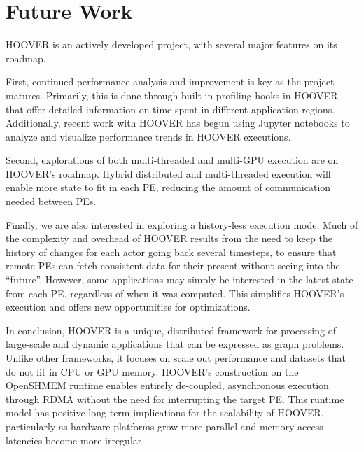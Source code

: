 \section{Future Work}

HOOVER is an actively developed project, with several major features on its
roadmap.

First, continued performance analysis and improvement is key as the project
matures. Primarily, this is done through built-in profiling hooks in HOOVER
that offer detailed information on time spent in different application regions.
Additionally, recent work with HOOVER has begun using Jupyter notebooks to
analyze and visualize performance trends in HOOVER executions.

Second, explorations of both multi-threaded and multi-GPU execution are on
HOOVER's roadmap. Hybrid distributed and multi-threaded execution will enable
more state to fit in each PE, reducing the amount of communication needed
between PEs.

Finally, we are also interested in exploring a history-less execution mode.
Much of the complexity and overhead of HOOVER results from the need to keep
the history of changes for each actor going back several timesteps, to ensure
that remote PEs can fetch consistent data for their present without seeing into
the ``future''. However, some applications may simply be interested in the
latest state from each PE, regardless of when it was computed. This
simplifies HOOVER's execution and offers new opportunities for optimizations.

In conclusion, HOOVER is a unique, distributed framework for processing of
large-scale and dynamic applications that can be expressed as graph
problems. Unlike other frameworks, it focuses on scale out performance and
datasets that do not fit in CPU or GPU memory. HOOVER's construction on the
OpenSHMEM runtime enables entirely de-coupled, asynchronous execution through
RDMA without the need for interrupting the target PE. This runtime model has
positive long term implications for the scalability of HOOVER, particularly
as hardware platforms grow more parallel and memory access latencies become more
irregular.

